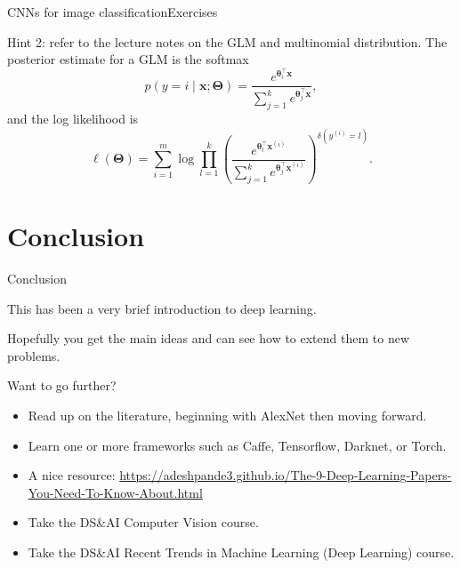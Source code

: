 \documentclass{beamer}
\renewcommand{\vec}[1]{\boldsymbol{#1}}
\begin{document}
\begin{frame}{CNNs for image classification}{Exercises}

Hint 2: refer to the lecture notes on the GLM and multinomial distribution.
The posterior estimate for a GLM is the softmax
\[ p(y = i \mid \vec{x}; \vec{\Theta}) = \frac{e^{\vec{\theta}_i^\top\vec{x}}}{\sum_{j=1}^k e^{\vec{\theta}_j^\top\vec{x}}}, \]
and the log likelihood is
\[ \ell(\vec{\Theta}) = \sum_{i=1}^m\log \prod_{l=1}^k \left(
\frac{e^{\vec{\theta}_l^\top\vec{x}^{(i)}}}{\sum_{j=1}^k e^{\vec{\theta}_j^\top\vec{x}^{(i)}}} \right)^{\delta(y^{(i)}=l)}. \]

\end{frame}

\section{Conclusion}

\begin{frame}{Conclusion}

  This has been a very brief introduction to deep learning.

  \medskip

  Hopefully you get the main ideas and can see how to extend them to
  new problems.

  \medskip

  Want to go further?
  \begin{itemize}
  \item Read up on the literature, beginning with AlexNet then moving forward.
  \item Learn one or more frameworks such as Caffe, Tensorflow,
    Darknet, or Torch.
  \item A nice resource: \url{https://adeshpande3.github.io/The-9-Deep-Learning-Papers-You-Need-To-Know-About.html}
  \item Take the DS\&AI Computer Vision course.
  \item Take the DS\&AI Recent Trends in Machine Learning (Deep
    Learning) course.
  \end{itemize}

\end{frame}
\end{document}
